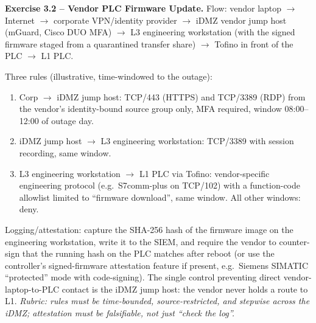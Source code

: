 \documentclass[11pt,a4paper]{article}
\begin{document}
\begin{solutionbox}
\textbf{Exercise 3.2 -- Vendor PLC Firmware Update.}
Flow: vendor laptop $\to$ Internet $\to$ corporate VPN/identity provider $\to$ iDMZ vendor jump host (mGuard, Cisco DUO MFA) $\to$ L3 engineering workstation (with the signed firmware staged from a quarantined transfer share) $\to$ Tofino in front of the PLC $\to$ L1 PLC.

Three rules (illustrative, time-windowed to the outage):
\begin{enumerate}\setlength{\itemsep}{1pt}
  \item Corp $\to$ iDMZ jump host: TCP/443 (HTTPS) and TCP/3389 (RDP) from the vendor's identity-bound source group only, MFA required, window 08:00--12:00 of outage day.
  \item iDMZ jump host $\to$ L3 engineering workstation: TCP/3389 with session recording, same window.
  \item L3 engineering workstation $\to$ L1 PLC via Tofino: vendor-specific engineering protocol (e.g.\ S7comm-plus on TCP/102) with a function-code allowlist limited to ``firmware download'', same window. All other windows: deny.
\end{enumerate}
Logging/attestation: capture the SHA-256 hash of the firmware image on the engineering workstation, write it to the SIEM, and require the vendor to counter-sign that the running hash on the PLC matches after reboot (or use the controller's signed-firmware attestation feature if present, e.g.\ Siemens SIMATIC ``protected'' mode with code-signing). The single control preventing direct vendor-laptop-to-PLC contact is the iDMZ jump host: the vendor never holds a route to L1. \emph{Rubric: rules must be time-bounded, source-restricted, and stepwise across the iDMZ; attestation must be falsifiable, not just ``check the log''.}
\end{solutionbox}
\end{document}
